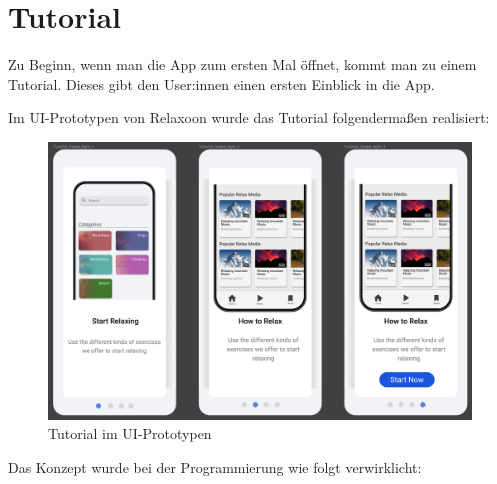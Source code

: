 \section{Tutorial}

Zu Beginn, wenn man die App zum ersten Mal öffnet, kommt man zu einem Tutorial. Dieses gibt den User:innen einen ersten
Einblick in die App.

Im UI-Prototypen von Relaxoon wurde das Tutorial folgendermaßen realisiert:

\begin{figure}[H]
    \centering
    \includegraphics[height=0.65\textwidth]{./pics/pTutorial.png}
    \caption{Tutorial im UI-Prototypen}
\end{figure}

\newpage

Das Konzept wurde bei der Programmierung wie folgt verwirklicht:

